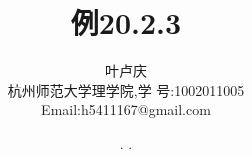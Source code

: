 \documentclass[a4paper, 12pt]{article} %
\makeatletter
\renewcommand{\maketitle}{ %
  \renewcommand\refname{参考文献}
  \newcommand{\D}{\displaystyle}\newcommand{\ri}{\Rightarrow}
  \newcommand{\ds}{\displaystyle} \renewcommand{\ni}{\noindent}
  \newcommand{\pa}{\partial} \newcommand{\Om}{\Omega}
  \newcommand{\om}{\omega} \newcommand{\sik}{\sum_{i=1}^k}
  \newcommand{\vov}{\Vert\omega\Vert} \newcommand{\Umy}{U_{\mu_i,y^i}}
  \newcommand{\lamns}{\lambda_n^{^{\scriptstyle\sigma}}}
  \newcommand{\chiomn}{\chi_{_{\Omega_n}}}
  \newcommand{\ullim}{\underline{\lim}} \newcommand{\bsy}{\boldsymbol}
  \newcommand{\mvb}{\mathversion{bold}} \newcommand{\la}{\lambda}
  \newcommand{\La}{\Lambda} \newcommand{\va}{\varepsilon}
  \newcommand{\be}{\beta} \newcommand{\al}{\alpha}
  \newcommand{\dis}{\displaystyle} \newcommand{\R}{{\mathbb R}}
  \newcommand{\N}{{\mathbb N}} \newcommand{\cF}{{\mathcal F}}
  \newcommand{\gB}{{\mathfrak B}} \newcommand{\eps}{\epsilon}
  \begin{flushright} %
    {\LARGE\@title} %
    
    \vspace{50pt} %
    
    {\large\@author} %
    \\\@date %
    
    \vspace{40pt} %
  \end{flushright}
}
\makeatother
\begin{document}
\begin{CJK}{UTF8}{gkai}
  \title{\textbf{例20.2.3}}
  \author{\small{叶卢庆}\\{\small{杭州师范大学理学院,学
        号:1002011005}}\\{\small{Email:h5411167@gmail.com}}} %
  \renewcommand{\today}{\number\year. \number\month. \number\day}
  \date{\today} %
  
  
  
  \maketitle %
  
  
  
  
  
  
  

\end{CJK}
\end{document}

